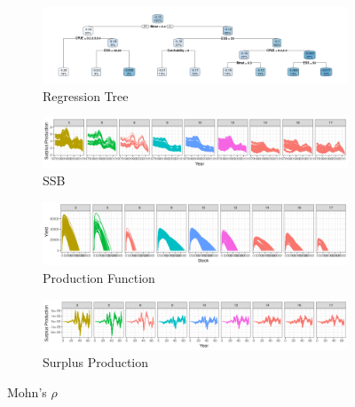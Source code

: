 \newpage
\begin{figure}[!ht]
	\centering
	\begin{subfigure}{0.9\textwidth}
		\centering
		\includegraphics[width=\textwidth]{figures/a-tree-1.png}
		\caption{Regression Tree}
		\label{fig:tree}
	\end{subfigure}
	\hfill
	\begin{subfigure}{0.9\textwidth}  
		\centering 
		\includegraphics[width=\textwidth]{figures/a-tree-biomass-1.png}
		\caption{SSB}
		\label{fig:tree-b}
	\end{subfigure}
	\begin{subfigure}{0.9\textwidth}  
		\centering 
		\includegraphics[width=\textwidth]{figures/a-tree-pf-1.png}
		\caption{Production Function}
		\label{fig:tree-pf}
	\end{subfigure}
	\begin{subfigure}{0.9\textwidth}
		\centering
	    \includegraphics[width=\textwidth]{figures/a-tree-sp-1.png}
		\caption{Surplus Production}
		\label{fig:tree-sp}
	\end{subfigure}
	\caption{Mohn's $\rho$}
	\label{fig:tree}
\end{figure}


